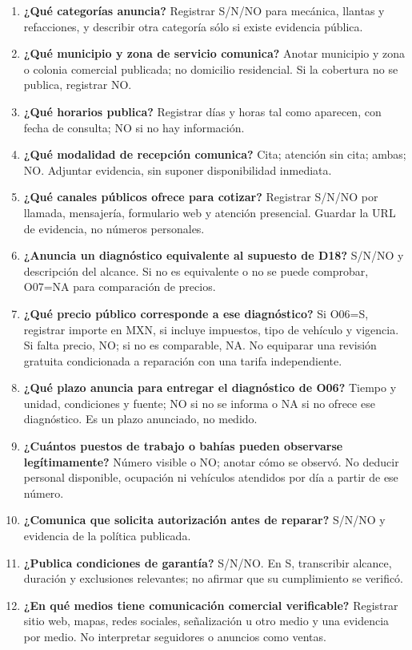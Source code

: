 {\begin{enumerate}
\item[O01.] \textbf{¿Qué categorías anuncia?} Registrar S/N/NO para mecánica, llantas y refacciones, y describir otra categoría sólo si existe evidencia pública.
\item[O02.] \textbf{¿Qué municipio y zona de servicio comunica?} Anotar municipio y zona o colonia comercial publicada; no domicilio residencial. Si la cobertura no se publica, registrar NO.
\item[O03.] \textbf{¿Qué horarios publica?} Registrar días y horas tal como aparecen, con fecha de consulta; NO si no hay información.
\item[O04.] \textbf{¿Qué modalidad de recepción comunica?} Cita; atención sin cita; ambas; NO. Adjuntar evidencia, sin suponer disponibilidad inmediata.
\item[O05.] \textbf{¿Qué canales públicos ofrece para cotizar?} Registrar S/N/NO por llamada, mensajería, formulario web y atención presencial. Guardar la URL de evidencia, no números personales.
\item[O06.] \textbf{¿Anuncia un diagnóstico equivalente al supuesto de D18?} S/N/NO y descripción del alcance. Si no es equivalente o no se puede comprobar, O07=NA para comparación de precios.
\item[O07.] \textbf{¿Qué precio público corresponde a ese diagnóstico?} Si O06=S, registrar importe en MXN, si incluye impuestos, tipo de vehículo y vigencia. Si falta precio, NO; si no es comparable, NA. No equiparar una revisión gratuita condicionada a reparación con una tarifa independiente.
\item[O08.] \textbf{¿Qué plazo anuncia para entregar el diagnóstico de O06?} Tiempo y unidad, condiciones y fuente; NO si no se informa o NA si no ofrece ese diagnóstico. Es un plazo anunciado, no medido.
\item[O09.] \textbf{¿Cuántos puestos de trabajo o bahías pueden observarse legítimamente?} Número visible o NO; anotar cómo se observó. No deducir personal disponible, ocupación ni vehículos atendidos por día a partir de ese número.
\item[O10.] \textbf{¿Comunica que solicita autorización antes de reparar?} S/N/NO y evidencia de la política publicada.
\item[O11.] \textbf{¿Publica condiciones de garantía?} S/N/NO. En S, transcribir alcance, duración y exclusiones relevantes; no afirmar que su cumplimiento se verificó.
\item[O12.] \textbf{¿En qué medios tiene comunicación comercial verificable?} Registrar sitio web, mapas, redes sociales, señalización u otro medio y una evidencia por medio. No interpretar seguidores o anuncios como ventas.

\end{enumerate}}
